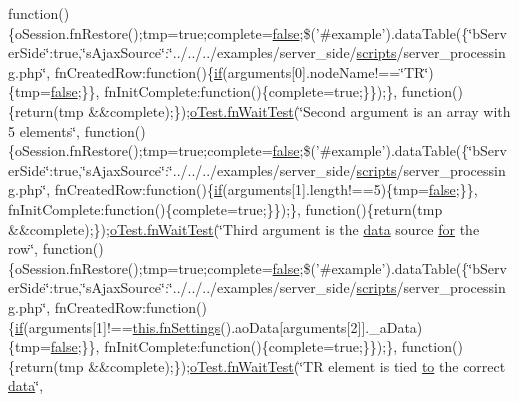 \begin{DoxyCompactItemize}
function()\{o\+Session.\+fn\+Restore();tmp=true;complete=\hyperlink{validate_8js_a5df37b7f02e5cdc7d9412b7f872b8e01}{false};\$('\#example').data\+Table(\{\char`\"{}b\+Server\+Side\char`\"{}\+:true,\char`\"{}s\+Ajax\+Source\char`\"{}\+:\char`\"{}../../../examples/server\+\_\+side/\hyperlink{tinymce_8jquery_8dev_8js_a09066d4d580eeec222f858d588b4cdef}{scripts}/server\+\_\+processing.\+php\char`\"{}, fn\+Created\+Row\+:function()\{\hyperlink{fullpage_2plugin_8js_a8b98017e64ef036adb9ae327ff94abe1}{if}(arguments\mbox{[}0\mbox{]}.node\+Name!==\char`\"{}T\+R\char`\"{})\{tmp=\hyperlink{validate_8js_a5df37b7f02e5cdc7d9412b7f872b8e01}{false};\}\}, fn\+Init\+Complete\+:function()\{complete=true;\}\});\}, function()\{return(tmp \&\&complete);\});\hyperlink{onhold_24__server-side_2__zero__config_8js_ab25c4d596771c0133cdc45178ce72c3d}{o\+Test.\+fn\+Wait\+Test}(\char`\"{}Second argument is an array with 5 elements\char`\"{}, function()\{o\+Session.\+fn\+Restore();tmp=true;complete=\hyperlink{validate_8js_a5df37b7f02e5cdc7d9412b7f872b8e01}{false};\$('\#example').data\+Table(\{\char`\"{}b\+Server\+Side\char`\"{}\+:true,\char`\"{}s\+Ajax\+Source\char`\"{}\+:\char`\"{}../../../examples/server\+\_\+side/\hyperlink{tinymce_8jquery_8dev_8js_a09066d4d580eeec222f858d588b4cdef}{scripts}/server\+\_\+processing.\+php\char`\"{}, fn\+Created\+Row\+:function()\{\hyperlink{fullpage_2plugin_8js_a8b98017e64ef036adb9ae327ff94abe1}{if}(arguments\mbox{[}1\mbox{]}.length!==5)\{tmp=\hyperlink{validate_8js_a5df37b7f02e5cdc7d9412b7f872b8e01}{false};\}\}, fn\+Init\+Complete\+:function()\{complete=true;\}\});\}, function()\{return(tmp \&\&complete);\});\hyperlink{onhold_24__server-side_2__zero__config_8js_ab25c4d596771c0133cdc45178ce72c3d}{o\+Test.\+fn\+Wait\+Test}(\char`\"{}Third argument is the \hyperlink{fullpage_2plugin_8js_a718c1bf5a3bf21ebb980203b142e5b75}{data} source \hyperlink{tinymce_8jquery_8dev_8js_a4675a875b20881bc5f7011f49fbd4da7}{for} the row\char`\"{}, function()\{o\+Session.\+fn\+Restore();tmp=true;complete=\hyperlink{validate_8js_a5df37b7f02e5cdc7d9412b7f872b8e01}{false};\$('\#example').data\+Table(\{\char`\"{}b\+Server\+Side\char`\"{}\+:true,\char`\"{}s\+Ajax\+Source\char`\"{}\+:\char`\"{}../../../examples/server\+\_\+side/\hyperlink{tinymce_8jquery_8dev_8js_a09066d4d580eeec222f858d588b4cdef}{scripts}/server\+\_\+processing.\+php\char`\"{}, fn\+Created\+Row\+:function()\{\hyperlink{fullpage_2plugin_8js_a8b98017e64ef036adb9ae327ff94abe1}{if}(arguments\mbox{[}1\mbox{]}!==\hyperlink{api_8methods_8js_a78f387fab92a85c2cb7830bc5d8a6141}{this.\+fn\+Settings}().ao\+Data\mbox{[}arguments\mbox{[}2\mbox{]}\mbox{]}.\+\_\+a\+Data)\{tmp=\hyperlink{validate_8js_a5df37b7f02e5cdc7d9412b7f872b8e01}{false};\}\}, fn\+Init\+Complete\+:function()\{complete=true;\}\});\}, function()\{return(tmp \&\&complete);\});\hyperlink{onhold_24__server-side_2__zero__config_8js_ab25c4d596771c0133cdc45178ce72c3d}{o\+Test.\+fn\+Wait\+Test}(\char`\"{}T\+R element is tied \hyperlink{jquery-ui_8js_af6086621f45baa2cf538f19e45d3c263}{to} the correct \hyperlink{fullpage_2plugin_8js_a718c1bf5a3bf21ebb980203b142e5b75}{data}\char`\"{}, 
\end{DoxyCompactItemize}
